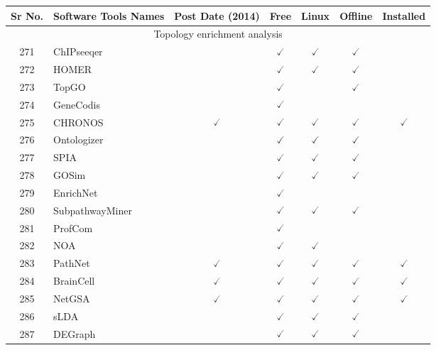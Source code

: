 \documentclass[10pt,letterpaper]{article}
\begin{document}
\begin{table}[!ht]
\begin{adjustwidth}{-2.25in}{0in} %
\centering
\begin{tabular}{|c|l|c|c|c|c|c|}
\hline
Sr No. & Software Tools Names & Post Date (2014) & Free & Linux & Offline & Installed \\ \hline
\hline
\multicolumn{7}{|c|}{Topology enrichment analysis} \\ \hline
\hline
271 & ChIPseeqer\cite{giannopoulou2011integrated} & & $\checked$ & $\checked$ & $\checked$ & \\ 
272 & HOMER\cite{heinz2010simple} & & $\checked$ & $\checked$ & $\checked$ & \\ 
273 & TopGO\cite{alexa2006improved} & & $\checked$ & & $\checked$ & \\ 
274 & GeneCodis\cite{nogales2009genecodis} & & $\checked$ & & & \\
275 & CHRONOS\cite{vrahatis2015chronos} & $\checked$ & $\checked$ & $\checked$ & $\checked$ & $\checked$  \\ 
276 & Ontologizer\cite{bauer2008ontologizer} & & $\checked$ & $\checked$ & $\checked$ & \\ 
277 & SPIA\cite{tarca2008novel} & & $\checked$ & $\checked$ & $\checked$ & \\ 
278 & GOSim\cite{frohlich2007gosim} & & $\checked$ & $\checked$ & $\checked$ & \\ 
279 & EnrichNet\cite{glaab2012enrichnet} & & $\checked$ & & & \\ 
280 & SubpathwayMiner\cite{li2009subpathwayminer} & & $\checked$ & $\checked$ & $\checked$ & \\ 
281 & ProfCom\cite{antonov2008profcom} & & $\checked$ & & & \\ 
282 & NOA\cite{wang2011noa} & & $\checked$ & $\checked$ & & \\ 
283 & PathNet\cite{dutta2012pathnet} & $\checked$ & $\checked$ & $\checked$ & $\checked$ & $\checked$  \\ 
284 & BrainCell\cite{delahaye2016rare} & $\checked$ & $\checked$ & $\checked$ & $\checked$ & $\checked$  \\ 
285 & NetGSA\cite{ma2016network} & $\checked$ & $\checked$ & $\checked$ & $\checked$ & $\checked$  \\ 
286 & sLDA\cite{wu2009sparse} & & $\checked$ & $\checked$ & $\checked$ & \\ 
287 & DEGraph\cite{jacob2012package} & & $\checked$ & $\checked$ & $\checked$ & \\

\end{tabular}
\end{adjustwidth}
\end{table}
\end{document}
